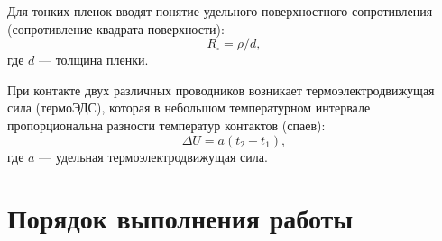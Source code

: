 Для тонких пленок вводят понятие удельного поверхностного сопротивления (сопротивление квадрата поверхности):
\begin{equation}
    R_\square = \rho / d,
    \label{eq:rho_surf}
\end{equation}
где $d$ — толщина пленки.

При контакте двух различных проводников возникает термоэлектродвижущая сила (термоЭДС), которая в небольшом температурном интервале пропорциональна разности температур контактов (спаев):
\begin{equation}
    \Delta U = a(t_2 - t_1),
    \label{eq:thermo_emf}
\end{equation}
где $a$ — удельная термоэлектродвижущая сила.

\section*{Порядок выполнения работы}

